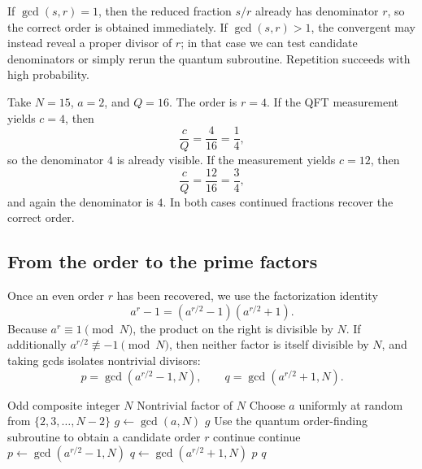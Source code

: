 If $\gcd(s,r)=1$, then the reduced fraction $s/r$ already has denominator $r$, so the correct order is obtained immediately. If $\gcd(s,r) > 1$, the convergent may instead reveal a proper divisor of $r$; in that case we can test candidate denominators or simply rerun the quantum subroutine. Repetition succeeds with high probability.

\begin{example}
Take $N=15$, $a=2$, and $Q=16$. The order is $r=4$. If the QFT measurement yields $c=4$, then
\[
    \frac{c}{Q} = \frac{4}{16} = \frac{1}{4},
\]
so the denominator $4$ is already visible. If the measurement yields $c=12$, then
\[
    \frac{c}{Q} = \frac{12}{16} = \frac{3}{4},
\]
and again the denominator is $4$. In both cases continued fractions recover the correct order.
\end{example}

\subsection{From the order to the prime factors}

Once an even order $r$ has been recovered, we use the factorization identity
\[
    a^r - 1 = \left(a^{r/2}-1\right)\left(a^{r/2}+1\right).
\]
Because $a^r \equiv 1 \pmod N$, the product on the right is divisible by $N$. If additionally $a^{r/2} \not\equiv -1 \pmod N$, then neither factor is itself divisible by $N$, and taking gcds isolates nontrivial divisors:
\[
    p = \gcd(a^{r/2}-1,N),
    \qquad
    q = \gcd(a^{r/2}+1,N).
\]

\makeatletter
\renewcommand{\theHALG@line}{\thealgorithm.\arabic{ALG@line}}
\makeatother

\begin{algorithm}[H]
\caption{Classical post-processing in Shor's algorithm}
\begin{algorithmic}
\Require Odd composite integer $N$
\Ensure Nontrivial factor of $N$
    \State Choose $a$ uniformly at random from $\{2,3,\dots,N-2\}$
    \State $g \leftarrow \gcd(a,N)$
        \State \Return $g$
    \EndIf
    \State Use the quantum order-finding subroutine to obtain a candidate order $r$
        \State continue
    \EndIf
        \State continue
    \EndIf
    \State $p \leftarrow \gcd(a^{r/2}-1,N)$
    \State $q \leftarrow \gcd(a^{r/2}+1,N)$
        \State \Return $p$
    \EndIf
        \State \Return $q$
    \EndIf
\EndWhile
\end{algorithmic}
\end{algorithm}

